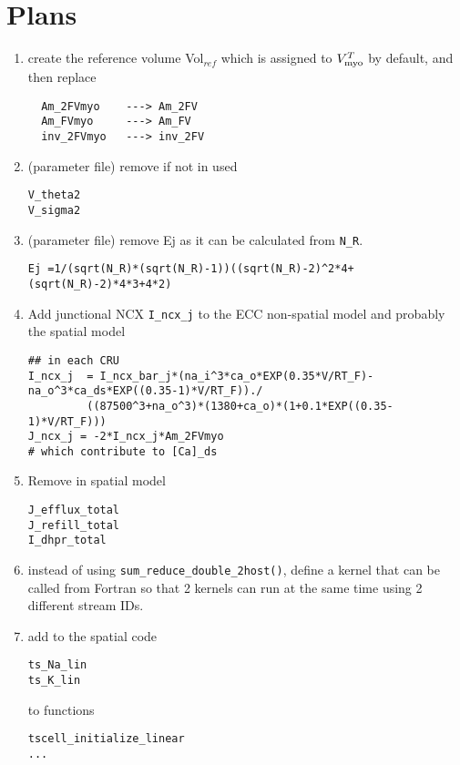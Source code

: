 \section{Plans}
\label{sec:plans}

\begin{enumerate}
  \item create the reference volume Vol$_{ref}$ which is assigned to $V_{\text{myo}}^T$
  by default, and then replace 
  \begin{verbatim}
  Am_2FVmyo    ---> Am_2FV
  Am_FVmyo     ---> Am_FV
  inv_2FVmyo   ---> inv_2FV
  \end{verbatim}
\item (parameter file)  remove if not in used
\begin{verbatim}
V_theta2
V_sigma2
\end{verbatim}

\item (parameter file) remove Ej as it can be calculated from \verb!N_R!. 
\begin{verbatim}
Ej =1/(sqrt(N_R)*(sqrt(N_R)-1))((sqrt(N_R)-2)^2*4+(sqrt(N_R)-2)*4*3+4*2)
\end{verbatim}


\item Add junctional NCX  \verb!I_ncx_j! to the ECC non-spatial model
  and probably the spatial model
\begin{verbatim}
## in each CRU
I_ncx_j  = I_ncx_bar_j*(na_i^3*ca_o*EXP(0.35*V/RT_F)-na_o^3*ca_ds*EXP((0.35-1)*V/RT_F))./
         ((87500^3+na_o^3)*(1380+ca_o)*(1+0.1*EXP((0.35-1)*V/RT_F)))
J_ncx_j = -2*I_ncx_j*Am_2FVmyo
# which contribute to [Ca]_ds
\end{verbatim}

\item Remove in spatial model

\begin{verbatim}
J_efflux_total
J_refill_total
I_dhpr_total
\end{verbatim}


\item instead of using \verb!sum_reduce_double_2host()!, define a
  kernel that can be called from Fortran so that 2 kernels can run at
  the same time using 2 different stream IDs.


\item add to the spatial code
\begin{verbatim}
ts_Na_lin
ts_K_lin
\end{verbatim}
to functions
\begin{verbatim}
tscell_initialize_linear
...
\end{verbatim}



\end{enumerate}
